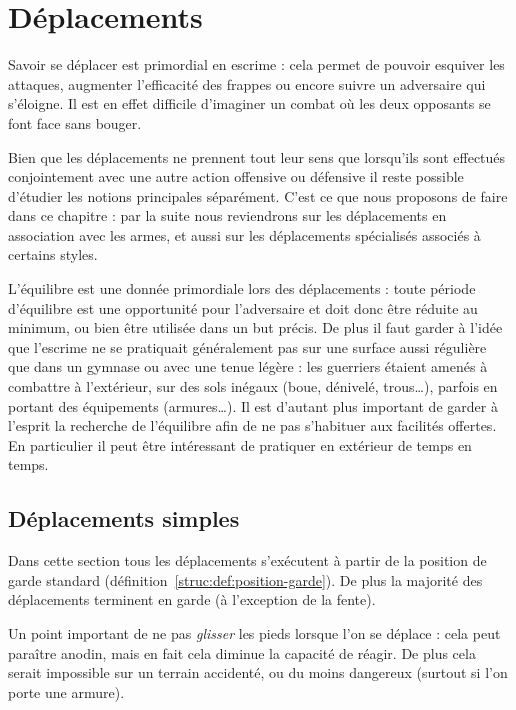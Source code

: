 \chapter{Déplacements}


Savoir se déplacer est primordial en escrime : cela permet de pouvoir esquiver les attaques, augmenter l'efficacité des frappes ou encore suivre un adversaire qui s'éloigne.
Il est en effet difficile d'imaginer un combat où les deux opposants se font face sans bouger.

Bien que les déplacements ne prennent tout leur sens que lorsqu'ils sont effectués conjointement avec une autre action offensive ou défensive il reste possible d'étudier les notions principales séparément.
C'est ce que nous proposons de faire dans ce chapitre : par la suite nous reviendrons sur les déplacements en association avec les armes, et aussi sur les déplacements spécialisés associés à certains styles.

L'équilibre est une donnée primordiale lors des déplacements : toute période d'équilibre est une opportunité pour l'adversaire et doit donc être réduite au minimum, ou bien être utilisée dans un but précis.
De plus il faut garder à l'idée que l'escrime ne se pratiquait généralement pas sur une surface aussi régulière que dans un gymnase ou avec une tenue légère : les guerriers étaient amenés à combattre à l'extérieur, sur des sols inégaux (boue, dénivelé, trous…), parfois en portant des équipements (armures…).
Il est d'autant plus important de garder à l'esprit la recherche de l'équilibre afin de ne pas s'habituer aux facilités offertes.
En particulier il peut être intéressant de pratiquer en extérieur de temps en temps.


\section{Déplacements simples}



Dans cette section tous les déplacements s'exécutent à partir de la position de garde standard (définition~\ref{struc:def:position-garde}).
De plus la majorité des déplacements terminent en garde (à l'exception de la fente).

Un point important de ne pas \emph{glisser} les pieds lorsque l'on se déplace : cela peut paraître anodin, mais en fait cela diminue la capacité de réagir.
De plus cela serait impossible sur un terrain accidenté, ou du moins dangereux (surtout si l'on porte une armure).


